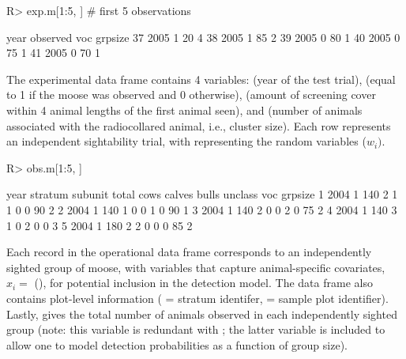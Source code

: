 \documentclass[nojss]{jss}
\begin{document}
\begin{Schunk}
\begin{Sinput}
R> exp.m[1:5, ] # first 5 observations
\end{Sinput}
\begin{Soutput}
   year observed voc grpsize
37 2005        1  20       4
38 2005        1  85       2
39 2005        0  80       1
40 2005        0  75       1
41 2005        0  70       1
\end{Soutput}
\end{Schunk}
The experimental data frame contains 4 variables:  (year
of the test trial),  (equal to 1 if the moose was
observed and 0 otherwise),  (amount of screening cover
within 4 animal lengths of the first animal seen), and
 (number of animals associated with the radiocollared
animal, i.e., cluster size).  Each row represents an independent
sightability trial, with  representing the random
variables ($w_{i})$.
\begin{Schunk}
\begin{Sinput}
R> obs.m[1:5, ]
\end{Sinput}
\begin{Soutput}
  year stratum subunit total cows calves bulls unclass voc grpsize
1 2004       1     140     2    1      1     0       0  90       2
2 2004       1     140     1    0      0     1       0  90       1
3 2004       1     140     2    0      0     2       0  75       2
4 2004       1     140     3    1      0     2       0   0       3
5 2004       1     180     2    2      0     0       0  85       2
\end{Soutput}
\end{Schunk}
Each record in the operational data frame corresponds to an
independently sighted group of moose, with variables that capture
animal-specific covariates, $x_{i} = $ (), for
potential inclusion in the detection model.  The data frame also
contains plot-level information ( = stratum identifer,
 = sample plot identifier). Lastly,  gives
the total number of animals observed in each independently sighted
group (note:  this variable is redundant with ;  the
latter variable is included to allow one to model detection
probabilities as a function of group size).
\end{document}
